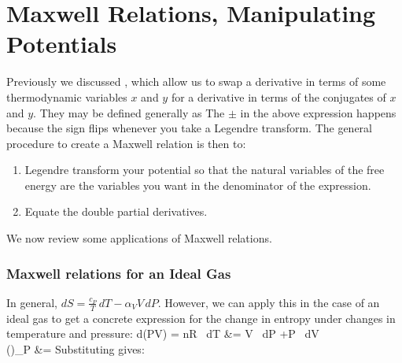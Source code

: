 \documentclass[12pt]{article}
\begin{document}
\section{Maxwell Relations, Manipulating Potentials}
Previously we discussed , which allow us to swap a derivative in terms of some thermodynamic variables $x$ and $y$ for a derivative in terms of the conjugates of $x$ and $y$. They may be defined generally as
\eqs {}
\eqe
The $ \pm $ in the above expression happens because the sign flips whenever you take a Legendre transform. The general procedure to create a Maxwell relation is then to: 
\begin{enumerate}
\item Legendre transform your potential so that the natural variables of the free energy are the variables you want in the denominator of the expression.
\item Equate the double partial derivatives.
\end{enumerate}
We now review some applications of Maxwell relations. 
\subsubsection{Maxwell relations for an Ideal Gas}
In general, $dS = \frac{c_P}{T}\,dT - \alpha_V V \,dP$. However, we can apply this in the case of an ideal gas to get a concrete expression for the change in entropy under changes in temperature and pressure:%
\eqs
d(PV) = nR \, dT &= V \, dP +P \, dV\\
\left(\right)_P &= 
\eqe
Substituting gives: 
\eqs
{}
\eqe
\end{document}

